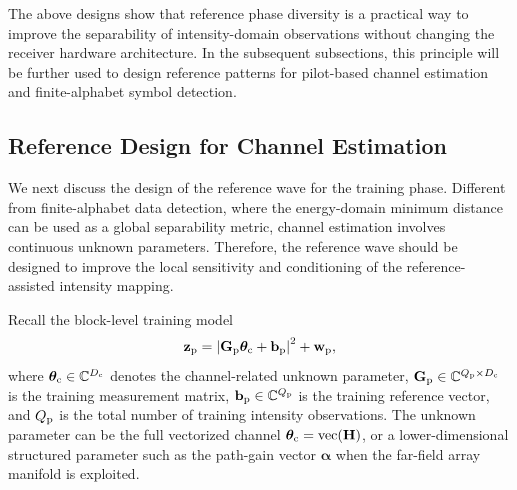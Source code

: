 \documentclass[journal]{IEEEtran}
\begin{document}
The above designs show that reference phase diversity is a practical way to improve the separability of intensity-domain observations without changing the receiver hardware architecture. 
In the subsequent subsections, this principle will be further used to design reference patterns for pilot-based channel estimation and finite-alphabet symbol detection.

\subsection{Reference Design for Channel Estimation}

We next discuss the design of the reference wave for the training phase. 
Different from finite-alphabet data detection, where the energy-domain minimum distance can be used as a global separability metric, channel estimation involves continuous unknown parameters. 
Therefore, the reference wave should be designed to improve the local sensitivity and conditioning of the reference-assisted intensity mapping.

Recall the block-level training model
\begin{equation}
\mathbf{z}_{\rm p}
=
\left|
\mathbf{G}_{\rm p}\boldsymbol{\theta}_{\rm c}
+
\mathbf{b}_{\rm p}
\right|^2
+
\mathbf{w}_{\rm p},
\label{eq:training_model_reference_design}
\end{equation}
where $\boldsymbol{\theta}_{\rm c}\in\mathbb{C}^{D_{\rm c}}$ denotes the channel-related unknown parameter, $\mathbf{G}_{\rm p}\in\mathbb{C}^{Q_{\rm p}\times D_{\rm c}}$ is the training measurement matrix, $\mathbf{b}_{\rm p}\in\mathbb{C}^{Q_{\rm p}}$ is the training reference vector, and $Q_{\rm p}$ is the total number of training intensity observations. 
The unknown parameter can be the full vectorized channel $\boldsymbol{\theta}_{\rm c}=\operatorname{vec}(\mathbf{H})$, or a lower-dimensional structured parameter such as the path-gain vector $\boldsymbol{\alpha}$ when the far-field array manifold is exploited.
\end{document}
